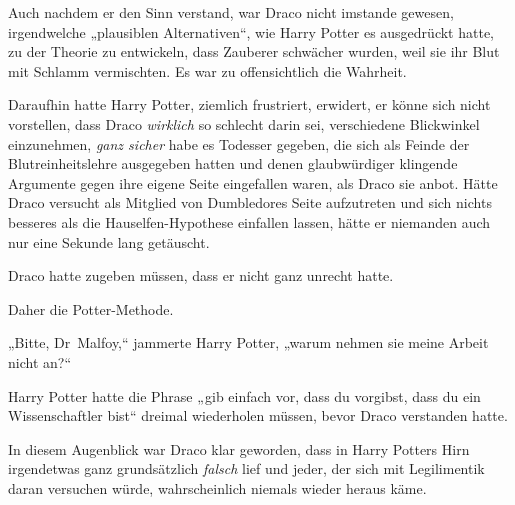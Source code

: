 Auch nachdem er den Sinn verstand, war Draco nicht imstande gewesen, irgendwelche „plausiblen Alternativen“, wie Harry Potter es ausgedrückt hatte, zu der Theorie zu entwickeln, dass Zauberer schwächer wurden, weil sie ihr Blut mit Schlamm vermischten. Es war zu offensichtlich die Wahrheit.

Daraufhin hatte Harry Potter, ziemlich frustriert, erwidert, er könne sich nicht vorstellen, dass Draco \emph{wirklich} so schlecht darin sei, verschiedene Blickwinkel einzunehmen, \emph{ganz sicher} habe es Todesser gegeben, die sich als Feinde der Blutreinheitslehre ausgegeben hatten und denen glaubwürdiger klingende Argumente gegen ihre eigene Seite eingefallen waren, als Draco sie anbot. Hätte Draco versucht als Mitglied von Dumbledores Seite aufzutreten und sich nichts besseres als die Hauselfen-Hypothese einfallen lassen, hätte er niemanden auch nur eine Sekunde lang getäuscht.

Draco hatte zugeben müssen, dass er nicht ganz unrecht hatte.

Daher die Potter-Methode.

„Bitte, Dr~Malfoy,“ jammerte Harry Potter, „warum nehmen sie meine Arbeit nicht an?“

Harry Potter hatte die Phrase „gib einfach vor, dass du vorgibst, dass du ein Wissenschaftler bist“ dreimal wiederholen müssen, bevor Draco verstanden hatte.

In diesem Augenblick war Draco klar geworden, dass in Harry Potters Hirn irgendetwas ganz grundsätzlich \emph{falsch} lief und jeder, der sich mit Legilimentik daran versuchen würde, wahrscheinlich niemals wieder heraus käme.

